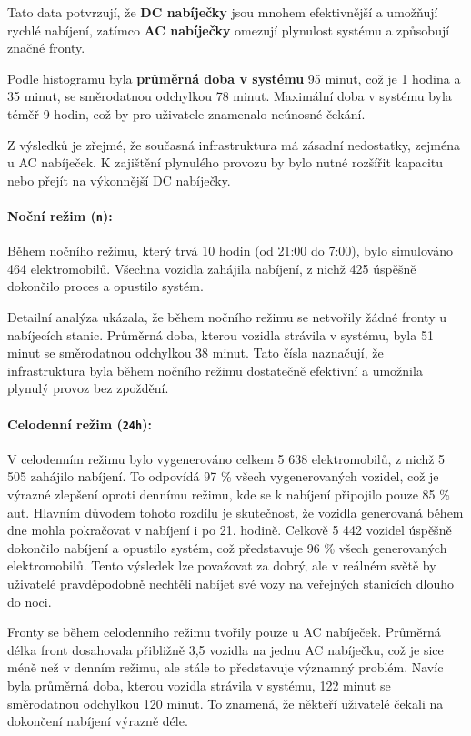\documentclass[a4paper,11pt]{article}
\begin{document}
Tato data potvrzují, že \textbf{DC nabíječky} jsou mnohem efektivnější a umožňují rychlé nabíjení, zatímco \textbf{AC nabíječky} omezují plynulost systému a způsobují značné fronty.

Podle histogramu byla \textbf{průměrná doba v systému} 95 minut, což je 1 hodina a 35 minut, se směrodatnou odchylkou 78 minut. Maximální doba v systému byla téměř 9 hodin, což by pro uživatele znamenalo neúnosné čekání. 

Z výsledků je zřejmé, že současná infrastruktura má zásadní nedostatky, zejména u AC nabíječek. K zajištění plynulého provozu by bylo nutné rozšířit kapacitu nebo přejít na výkonnější DC nabíječky.

\paragraph{Noční režim (\texttt{n}):} 
Během nočního režimu, který trvá 10 hodin (od 21:00 do 7:00), bylo simulováno 464 elektromobilů. Všechna vozidla zahájila nabíjení, z nichž 425 úspěšně dokončilo proces a opustilo systém. 

Detailní analýza ukázala, že během nočního režimu se netvořily žádné fronty u nabíjecích stanic. Průměrná doba, kterou vozidla strávila v systému, byla 51 minut se směrodatnou odchylkou 38 minut. Tato čísla naznačují, že infrastruktura byla během nočního režimu dostatečně efektivní a umožnila plynulý provoz bez zpoždění.


\paragraph{Celodenní režim (\texttt{24h}):} 
V celodenním režimu bylo vygenerováno celkem 5 638 elektromobilů, z nichž 5 505 zahájilo nabíjení. To odpovídá 97 \% všech vygenerovaných vozidel, což je výrazné zlepšení oproti dennímu režimu, kde se k nabíjení připojilo pouze 85 \% aut. Hlavním důvodem tohoto rozdílu je skutečnost, že vozidla generovaná během dne mohla pokračovat v nabíjení i po 21. hodině. Celkově 5 442 vozidel úspěšně dokončilo nabíjení a opustilo systém, což představuje 96 \% všech generovaných elektromobilů. Tento výsledek lze považovat za dobrý, ale v reálném světě by uživatelé pravděpodobně nechtěli nabíjet své vozy na veřejných stanicích dlouho do noci.

Fronty se během celodenního režimu tvořily pouze u AC nabíječek. Průměrná délka front dosahovala přibližně 3,5 vozidla na jednu AC nabíječku, což je sice méně než v denním režimu, ale stále to představuje významný problém. Navíc byla průměrná doba, kterou vozidla strávila v systému, 122 minut se směrodatnou odchylkou 120 minut. To znamená, že někteří uživatelé čekali na dokončení nabíjení výrazně déle.
\end{document}

